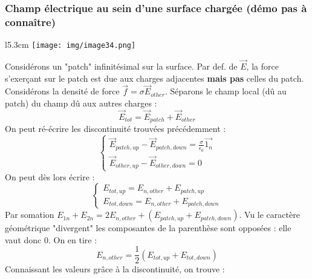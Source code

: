 \documentclass[british,french,11pt, a4paper, openany]{book}
\begin{document}
		\subsubsection{Champ électrique au sein d'une surface chargée (démo pas à connaître)}
		\begin{wrapfigure}[12]{l}{5.3cm}
			\texttt{[image: img/image34.png]}
		\end{wrapfigure}
		Considérons un "patch" infinitésimal sur la surface. Par def. de $\vec E$, la force s'exerçant sur le patch est due aux charges adjacentes \textbf{mais pas} celles du patch. Considérons la densité de force $\vec{f} = \sigma\vec{E}_{other}$. Séparons le champ local (dû au patch) du champ dû aux autres charges :
		\begin{equation}
		\vec{E}_{tot} = \vec{E}_{patch} + \vec{E}_{other}
		\end{equation}
		On peut ré-écrire les discontinuité trouvées précédemment :
		\begin{equation}
		\left\{\begin{array}{l}
		\vec{E}_{patch,up} - \vec{E}_{patch,down} = \frac{\sigma}{\epsilon_0}\vec{1_n}\\
		\vec{E}_{other, up} - \vec{E}_{other,down} = 0
		\end{array}\right.
		\end{equation}
		On peut dès lors écrire :
		\begin{equation}
		\left\{\begin{array}{l}
		E_{tot, up} = E_{n,other} + E_{patch, up}\\
		E_{tot,down} = E_{n,other} + E_{patch, down}
		\end{array}\right.
		\end{equation}
		Par somation $E_{1n} + E_{2n} = 2E_{n,other} + (E_{patch,up} + E_{patch, down})$. Vu le caractère géométrique "divergent" les composantes de la parenthèse sont opposées : elle vaut donc 0. On en tire :
		\begin{equation}
		E_{n,other} = \frac{1}{2}(E_{tot,up} + E_{tot,down})
		\end{equation}
		Connaissant les valeurs grâce à la discontinuité, on trouve :\\
		
		
\end{document}
